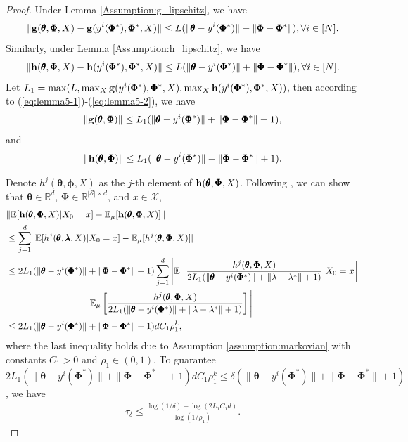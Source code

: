 \documentclass{article} %
\theoremstyle{plain}
\theoremstyle{definition}
\theoremstyle{remark}
\newcommand{\cX}{\mathcal{X}}
\newcommand{\cS}{\mathcal{S}}
\begin{document}
{\begin{proof}
Under Lemma \ref{Assumption:g_lipschitz}, we have
 \begin{align}\label{eq:lemma5-1}
     \|\bg(\pmb{\theta}, \pmb{\Phi}, X)-\bg(y^i(\pmb{\Phi}^*), \pmb{\Phi}^*, X)\|\leq L(\|\pmb{\theta}-y^i(\pmb{\Phi}^*)\|+\|\pmb{\Phi}-\pmb{\Phi}^*\|), \forall i\in[N].
 \end{align}
Similarly, under Lemma \ref{Assumption:h_lipschitz}, we have
\begin{align}\label{eq:lemma5-2}
     \|\bh(\pmb{\theta}, \pmb{\Phi}, X)-\bh(y^i(\pmb{\Phi}^*), \pmb{\Phi}^*, X)\|\leq L(\|\pmb{\theta}-y^i(\pmb{\Phi}^*)\|+\|\pmb{\Phi}-\pmb{\Phi}^*\|), \forall i\in[N].
 \end{align}
 Let $L_1=\max(L, \max_X {\mathbf{g}}(y^i(\pmb{\Phi}^*), \pmb{\Phi}^*, X), \max_X \mathbf{h}(y^i(\pmb{\Phi}^*), \pmb{\Phi}^*, X))$, then according to (\ref{eq:lemma5-1})-(\ref{eq:lemma5-2}), we have
\begin{align*}
     \|{\mathbf{g}}(\pmb{\theta}, \pmb{\Phi})\|\leq L_1(\|\pmb{\theta}-y^i(\pmb{\Phi}^*)\|+\|\pmb{\Phi}-\pmb{\Phi}^*\|+1),
 \end{align*}
 and 
 \begin{align*}
     \|\mathbf{h}(\pmb{\theta}, \pmb{\Phi})\|\leq L_1(\|\pmb{\theta}-y^i(\pmb{\Phi}^*)\|+\|\pmb{\Phi}-\pmb{\Phi}^*\|+1).
 \end{align*}
 
 Denote $h^j(\pmb{\theta}, \pmb{\phi}, X)$ as the $j$-th element of $\mathbf{h}(\pmb{\theta}, \pmb{\Phi}, X)$. Following \cite{chen2019performance}, we can show that $\pmb{\theta}\in\mathbb{R}^{d}$, $
\pmb{\Phi}\in\mathbb{R}^{|\cS|\times d}$, and $x\in\cX$,
 \begin{align*}
     &\|\mathbb{E}[\mathbf{h}( \pmb{\theta}, \pmb{\Phi}, X)|X_0=x]-\mathbb{E}_\mu[\mathbf{h}( \pmb{\theta}, \pmb{\Phi}, X)]\|\\
    & \leq \sum_{j=1}^{d}|\mathbb{E}[h^j(\pmb{\theta}, \pmb{\lambda}, X)|X_0=x]-\mathbb{E}_\mu[h^j( \pmb{\theta}, \pmb{\Phi}, X)]|\\
    &\leq 2L_1(\|\pmb{\theta}-y^i(\pmb{\Phi}^*)\|+\|\pmb{\Phi}-\pmb{\Phi}^*\|+1)\sum_{j=1}^{d}\Bigg|\mathbb{E}\left[\frac{h^j( \pmb{\theta}, \pmb{\Phi}, X)}{2L_1(\|\pmb{\theta}-y^i(\pmb{\Phi}^*)\|+\|{\lambda}-{\lambda}^*\|+1)}\Big|X_0=x\right]\\
    &\qquad\qquad\qquad\qquad-\mathbb{E}_\mu\left[\frac{h^j(\pmb{\theta}, \pmb{\Phi},X)}{2L_1(\|\pmb{\theta}-y^i(\pmb{\Phi}^*)\|+\|{\lambda}-{\lambda}^*\|+1)}\right]\Bigg|\\
    &\leq 2L_1(\|\pmb{\theta}-y^i(\pmb{\Phi}^*)\|+\|\pmb{\Phi}-\pmb{\Phi}^*\|+1)dC_1\rho_1^k,
\end{align*}
where the last inequality holds due to Assumption \ref{assumption:markovian} with constants $C_1>0$ and $\rho_1\in(0,1)$.
To guarantee $2L_1(\|\pmb{\theta}-y^i(\pmb{\Phi}^*)\|+\|\pmb{\Phi}-\pmb{\Phi}^*\|+1)dC_1\rho_1^k\leq \delta(\|\pmb{\theta}-y^i(\pmb{\Phi}^*)\|+\|\pmb{\Phi}-\pmb{\Phi}^*\|+1)$, we have
\begin{align}\label{eq:22}
   \tau_\delta\leq \frac{\log(1/\delta)+\log(2L_1C_1d)}{\log(1/\rho_1)}. 
\end{align}


\end{proof}}
\end{document}
